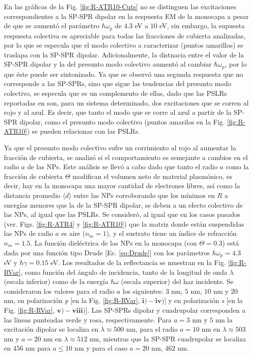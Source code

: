 En las gráficas de la Fig. \ref{fig:R-ATR10-Cuts} no se distinguen las excitaciones correspondientes a la SP-SPR dipolar en la respuesta EM de la monocapa a pesar de que se aumentó el parámetro $\hbar\omega_p$ de $4.3$ eV a $10$ eV, sin embargo, la supuesta respuesta colectiva es apreciable para todas las fracciones de cubierta analizadas, por lo que se especula que el modo colectivo a caracterizar (puntos amarillos) se traslapa con la SP-SPR  dipolar. Adicionalmente, la distnacia entre el valor de la SP-SPR dipolar y la del presunto modo colectivo aumentó al cambiar $\hbar\omega_p$, por lo que éste puede ser sintonizado. Ya que se observó una segunda respuesta que no corresponde a las SP-SPRs, sino que sigue las tendencias del presunto modo colectivo, se especula que es un complemento  de ellas, dado que las  PSLRs reportadas en \cite{danilov2018ultra} son, para un sistema determinado, dos excitaciones que se corren al rojo y al azul. Es decir, que tanto el modo que se corre al azul a partir de la SP-SPR dipolar, como el presunto modo colectivo (puntos amarilos en la Fig. \ref{fig:R-ATR10}) se pueden relacionar con las PSLRs.  

 Ya que el presunto modo colectivo sufre un corrimiento al rojo al aumentar la fracción de cubierta, se analizó si el comportamiento es semejante a cambios en el radio $a$ de las NPs.  Este análisis se llevó a cabo dado que tanto el radio $a$ como la fracción de cubierta $\Theta$ modifican el volumen neto de material plasmónico, es decir, hay en la monocapa una mayor cantidad de electrones libres, así como la distancia promedio $\langle d  \rangle$ entre las NPs  corroborando que los mínimos en $R$  a energías menores que la de la SP-SPR dipolar, se deben a un efecto colectivo de las NPs, al igual que las PSLRs. Se consideró, al igual que en los casos pasados (ver. Figs. \ref{fig:R-ATR4} y  \ref{fig:R-ATR10}) que la matriz donde están suspendidas las NPs de radio $a$ es aire ($n_m = 1$), y el sustrato tiene un índice de refracción $n_m= 1.5$. La función dieléctrica de las NPs en la monocapa (con $\Theta=0.3$) está dada por una función tipo Drude [Ec. \eqref{eq:Drude}] con los parámetros $\hbar\omega_p =4.3$ eV y $\hbar\gamma=0.15$ eV. Los resultados de la reflectancia se muestran en la Fig.  \ref{fig:R-RVar}, como función del ángulo de incidencia, tanto de la longitud de onda $\lambda$ (escala inferior) como de la  energía $\hbar\omega$ (escala superior) del haz incidente. Se consideraron los valores para el radio $a$ los siguientes: $3$ nm, $5$ nm, $10$ nm y $20$ nm,  en polarización \emph{p} [en la Fig.  \ref{fig:R-RVar}, $\mathbf{i)-iv)}$] y en polarización \emph{s} [en la Fig.  \ref{fig:R-RVar}, $\mathbf{v)-viii)}$].  Las SP-SPRs dipolar y cuadrupolar corresponden a las líneas punteadas verde y rosa, respectivamente. Para $a = 3$ nm y $5$ nm la excitación dipolar se localiza en $\lambda\approx 500$ nm, para el radio  $a = 10$ nm en $\lambda\approx 503$ nm y $a=20$ nm en $\lambda\approx 512$ nm, mientras que la SP-SPR cuadrupolar se localiza en $456$ nm para $a\leq 10$ nm y para el caso  $a=20$ nm, $462$ nm.

